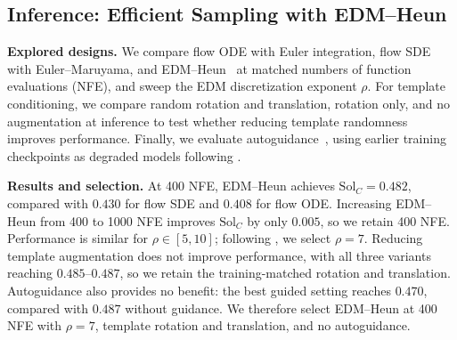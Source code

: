 \subsection{Inference: Efficient Sampling with EDM--Heun}
\label{sec:recipe-inference}

\textbf{Explored designs.}
We compare flow ODE with Euler integration, flow SDE with Euler--Maruyama, and
EDM--Heun~\citep{karras2022elucidating} at matched numbers of function
evaluations (NFE), and sweep the EDM discretization exponent $\rho$. For
template conditioning, we compare random rotation and translation, rotation
only, and no augmentation at inference to test whether reducing template
randomness improves performance. Finally, we evaluate
autoguidance~\citep{karras2024guiding}, using earlier training checkpoints as
degraded models following \citet{geffner2025proteina}.

\textbf{Results and selection.}
At 400 NFE, EDM--Heun achieves $\mathrm{Sol}_C=0.482$, compared with $0.430$
for flow SDE and $0.408$ for flow ODE. Increasing EDM--Heun from 400 to 1000
NFE improves $\mathrm{Sol}_C$ by only $0.005$, so we retain 400 NFE.
Performance is similar for $\rho\in[5,10]$; following
\citet{karras2022elucidating}, we select $\rho=7$. Reducing template
augmentation does not improve performance, with all three variants reaching
$0.485$--$0.487$, so we retain the training-matched rotation and translation.
Autoguidance also provides no benefit: the best guided setting reaches $0.470$,
compared with $0.487$ without guidance. We therefore select EDM--Heun at 400 NFE with
$\rho=7$, template rotation and translation, and no autoguidance.



